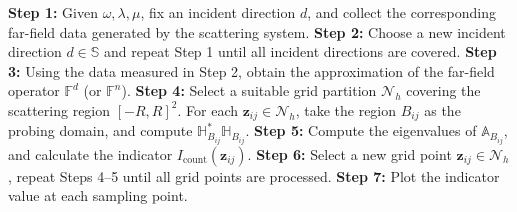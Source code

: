 \documentclass[11pt,reqno,twoside]{amsart}
\theoremstyle{definition}
\theoremstyle{remark}
\numberwithin{equation}{section}
\begin{document}
\begin{algorithm}[!htbp]
\caption{Counting-based monotonicity sampling method}
\label{alg:discrete monotonicity}
\begin{algorithmic}[1]
\State \textbf{Step 1:} Given $\omega, \lambda, \mu$, fix an incident direction $d$, and collect the corresponding far-field data generated by the scattering system.
\State \textbf{Step 2:} Choose a new incident direction $d \in \mathbb{S}$ and repeat Step 1 until all incident directions are covered.
\State \textbf{Step 3:} Using the data measured in Step 2, obtain the approximation  of the far-field operator $\mathbb{F}^d$ (or $\mathbb{F}^n$).
\State \textbf{Step 4:} Select a suitable grid partition $\mathcal{N}_h$ covering the scattering region $[-R, R]^2$. For each $\mathbf z_{ij} \in \mathcal{N}_h$, take the region $B_{ij}$ as the probing domain, and compute $\mathbb{H}_{B_{ij}}^* \mathbb{H}_{B_{ij}}$.
\State \textbf{Step 5:} Compute the eigenvalues of \(\mathbb{A}_{B_{ij}}\), and calculate the indicator \( I_{\mathrm{count}}(\mathbf z_{ij}) \).
\State \textbf{Step 6:} Select a new grid point $\mathbf z_{ij} \in \mathcal{N}_h$, repeat Steps 4–5 until all grid points are processed.
\State \textbf{Step 7:} Plot the indicator value at each sampling point.
\end{algorithmic}
\end{algorithm}
\end{document}
